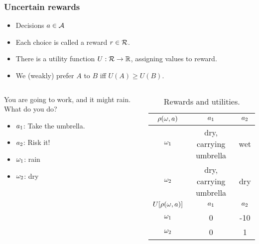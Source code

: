 \begin{frame}
  \frametitle{Uncertain rewards}
  \begin{itemize}
  \item Decisions $a \in \mathcal{A}$
  \item Each choice is called a \alert{reward} $r \in {\mathcal{R}}$.
  \item There is a \alert{utility function} $U : {\mathcal{R}} \to {\mathbb{R}}$, assigning values to reward.
  \item We (weakly) prefer $A$ to $B$ iff $U(A) \geq U(B)$.
  \end{itemize}

  \begin{example}
    \begin{columns}
      \begin{column}{0.5\textwidth}
        You are going to work, and it might rain.  What do you do?
        \begin{itemize}
        \item $a_1$: Take the umbrella.
        \item $a_2$: Risk it!
        \item $\omega_1$: rain
        \item $\omega_2$: dry
        \end{itemize}
      \end{column}
      \begin{column}{0.5\textwidth}
        \begin{table}
          \centering
          \begin{tabular}{c|c|c}
            $\rho(\omega,a)$ & $a_1$ & $a_2$ \\ %
            \hline
            $\omega_1$ & dry, carrying umbrella & wet\\
            $\omega_2$ & dry, carrying umbrella & dry\\
            \hline
            \hline
            $U[\rho(\omega,a)]$ & $a_1$ & $a_2$ \\
            \hline
            $\omega_1$ & 0 & -10\\
            $\omega_2$ & 0 & 1
          \end{tabular}
          \caption{Rewards and utilities.}
          \label{tab:rain-utility-function}
        \end{table}


\end{column}
\end{columns}
\end{example}
\end{frame}
